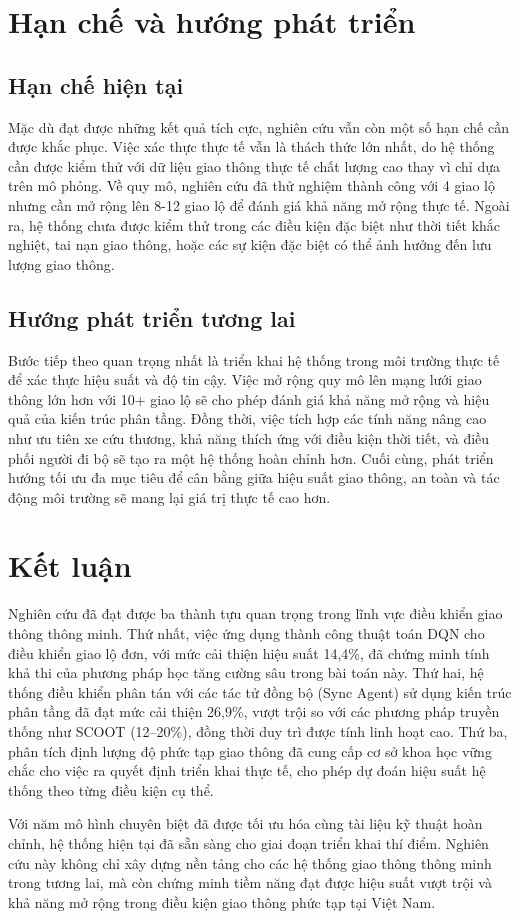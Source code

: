 \section{Hạn chế và hướng phát triển}

\subsection{Hạn chế hiện tại}
Mặc dù đạt được những kết quả tích cực, nghiên cứu vẫn còn một số hạn chế cần được khắc phục. Việc xác thực thực tế vẫn là thách thức lớn nhất, do hệ thống cần được kiểm thử với dữ liệu giao thông thực tế chất lượng cao thay vì chỉ dựa trên mô phỏng. Về quy mô, nghiên cứu đã thử nghiệm thành công với 4 giao lộ nhưng cần mở rộng lên 8-12 giao lộ để đánh giá khả năng mở rộng thực tế. Ngoài ra, hệ thống chưa được kiểm thử trong các điều kiện đặc biệt như thời tiết khắc nghiệt, tai nạn giao thông, hoặc các sự kiện đặc biệt có thể ảnh hưởng đến lưu lượng giao thông.

\subsection{Hướng phát triển tương lai}
Bước tiếp theo quan trọng nhất là triển khai hệ thống trong môi trường thực tế để xác thực hiệu suất và độ tin cậy. Việc mở rộng quy mô lên mạng lưới giao thông lớn hơn với 10+ giao lộ sẽ cho phép đánh giá khả năng mở rộng và hiệu quả của kiến trúc phân tầng. Đồng thời, việc tích hợp các tính năng nâng cao như ưu tiên xe cứu thương, khả năng thích ứng với điều kiện thời tiết, và điều phối người đi bộ sẽ tạo ra một hệ thống hoàn chỉnh hơn. Cuối cùng, phát triển hướng tối ưu đa mục tiêu để cân bằng giữa hiệu suất giao thông, an toàn và tác động môi trường sẽ mang lại giá trị thực tế cao hơn.

\section{Kết luận}

Nghiên cứu đã đạt được ba thành tựu quan trọng trong lĩnh vực điều khiển giao thông thông minh. Thứ nhất, việc ứng dụng thành công thuật toán DQN cho điều khiển giao lộ đơn, với mức cải thiện hiệu suất 14,4\%, đã chứng minh tính khả thi của phương pháp học tăng cường sâu trong bài toán này. Thứ hai, hệ thống điều khiển phân tán với các tác tử đồng bộ (Sync Agent) sử dụng kiến trúc phân tầng đã đạt mức cải thiện 26,9\%, vượt trội so với các phương pháp truyền thống như SCOOT (12–20\%), đồng thời duy trì được tính linh hoạt cao. Thứ ba, phân tích định lượng độ phức tạp giao thông đã cung cấp cơ sở khoa học vững chắc cho việc ra quyết định triển khai thực tế, cho phép dự đoán hiệu suất hệ thống theo từng điều kiện cụ thể.

Với năm mô hình chuyên biệt đã được tối ưu hóa cùng tài liệu kỹ thuật hoàn chỉnh, hệ thống hiện tại đã sẵn sàng cho giai đoạn triển khai thí điểm. Nghiên cứu này không chỉ xây dựng nền tảng cho các hệ thống giao thông thông minh trong tương lai, mà còn chứng minh tiềm năng đạt được hiệu suất vượt trội và khả năng mở rộng trong điều kiện giao thông phức tạp tại Việt Nam.
